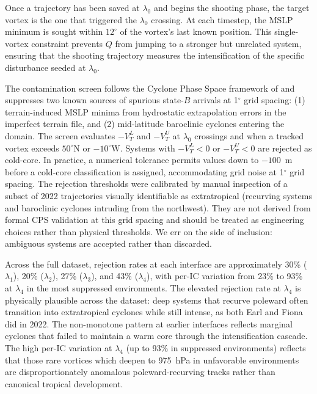 \documentclass[11pt]{article}
\begin{document}
Once a trajectory has been saved at $\lambda_0$ and begins the shooting phase, the
target vortex is the one that triggered the $\lambda_0$ crossing.  At each timestep,
the MSLP minimum is sought within $12^\circ$ of the vortex's last known position.
This single-vortex constraint prevents $Q$ from jumping to a stronger but unrelated
system, ensuring that the shooting trajectory measures the intensification of the
specific disturbance seeded at $\lambda_0$.

The contamination screen follows the Cyclone Phase Space framework of \citet{hart2003cyclone}
and suppresses two known sources of spurious state-$B$ arrivals at 1$^\circ$ grid spacing:
(1) terrain-induced MSLP minima from hydrostatic extrapolation errors in the imperfect
terrain file, and (2) mid-latitude baroclinic cyclones entering the domain.
The screen evaluates $-V_T^L$ and $-V_T^U$ at $\lambda_0$ crossings and when a
tracked vortex exceeds $50^\circ$N or $-10^\circ$W. Systems with $-V_T^L < 0$ or
$-V_T^U < 0$ are rejected as cold-core. In practice, a numerical tolerance permits
values down to $-100$~m before a cold-core classification is assigned, accommodating
grid noise at 1$^\circ$ grid spacing.
The rejection thresholds were calibrated by manual inspection of a subset of 2022
trajectories visually identifiable as extratropical (recurving systems and baroclinic
cyclones intruding from the northwest). They are not derived from formal CPS
validation at this grid spacing and should be treated as engineering choices rather
than physical thresholds. We err on the side of inclusion: ambiguous systems are accepted rather than discarded.

Across the full dataset, rejection rates at each interface are approximately
30\% ($\lambda_1$), 20\% ($\lambda_2$), 27\% ($\lambda_3$), and 43\% ($\lambda_4$),
with per-IC variation from 23\% to 93\% at $\lambda_4$ in the most suppressed environments.
The elevated rejection rate at $\lambda_4$ is physically plausible across the dataset: deep systems that recurve poleward often transition into extratropical cyclones while still intense, as both Earl and Fiona did in 2022.
The non-monotone pattern at earlier interfaces reflects marginal cyclones that failed
to maintain a warm core through the intensification cascade.
The high per-IC variation at $\lambda_4$ (up to 93\% in suppressed environments)
reflects that those rare vortices which deepen to 975~hPa in unfavorable environments
are disproportionately anomalous poleward-recurving tracks rather than canonical
tropical development.
\end{document}
